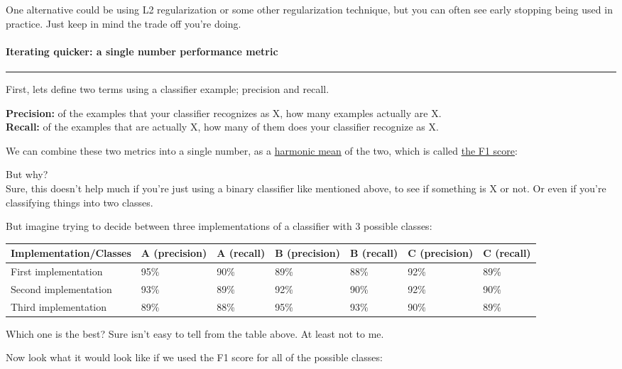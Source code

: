 \documentclass[
]{article}
\begin{document}
One alternative could be using L2 regularization or some other
regularization technique, but you can often see early stopping being
used in practice. Just keep in mind the trade off you're doing.

\hypertarget{header-n148}{%
\paragraph{\texorpdfstring{\textbf{Iterating quicker: a single number
performance
metric}}{Iterating quicker: a single number performance metric}}\label{header-n148}}

\begin{center}\rule{0.5\linewidth}{0.5pt}\end{center}

First, lets define two terms using a classifier example; precision and
recall.

\textbf{Precision:} of the examples that your classifier recognizes as
X, how many examples actually are X.\\
\textbf{Recall:} of the examples that are actually X, how many of them
does your classifier recognize as X.

We can combine these two metrics into a single number, as a
\href{https://www.wikiwand.com/en/Harmonic_mean}{harmonic mean} of the
two, which is called \href{https://www.wikiwand.com/en/F1_score}{the F1
score}:

But why?\\
Sure, this doesn't help much if you're just using a binary classifier
like mentioned above, to see if something is X or not. Or even if you're
classifying things into two classes.

But imagine trying to decide between three implementations of a
classifier with 3 possible classes:

\begin{longtable}[]{@{}lllllll@{}}
\toprule
Implementation/Classes & A (precision) & A (recall) & B (precision) & B
(recall) & C (precision) & C (recall)\tabularnewline
\midrule
\endhead
First implementation & 95\% & 90\% & 89\% & 88\% & 92\% &
89\%\tabularnewline
Second implementation & 93\% & 89\% & 92\% & 90\% & 92\% &
90\%\tabularnewline
Third implementation & 89\% & 88\% & 95\% & 93\% & 90\% &
89\%\tabularnewline
\bottomrule
\end{longtable}

Which one is the best? Sure isn't easy to tell from the table above. At
least not to me.

Now look what it would look like if we used the F1 score for all of the
possible classes:
\end{document}
